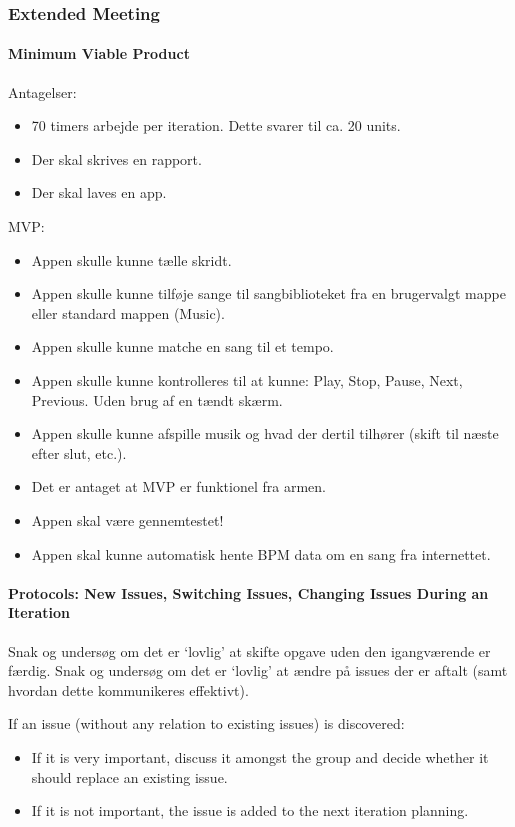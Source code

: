 \subsubsection{Extended Meeting}

\paragraph{Minimum Viable Product}
Antagelser:
\begin{itemize}
\item 70 timers arbejde per iteration. Dette svarer til ca. 20 units.
\item Der skal skrives en rapport.
\item Der skal laves en app.
\end{itemize}
MVP:
\begin{itemize}
\item Appen skulle kunne tælle skridt.
\item Appen skulle kunne tilføje sange til sangbiblioteket fra en brugervalgt mappe eller standard mappen (Music).
\item Appen skulle kunne matche en sang til et tempo.
\item Appen skulle kunne kontrolleres til at kunne: Play, Stop, Pause, Next, Previous. Uden brug af en tændt skærm.
\item Appen skulle kunne afspille musik og hvad der dertil tilhører (skift til næste efter slut, etc.).
\item Det er antaget at MVP er funktionel fra armen.
\item Appen skal være gennemtestet!
\item Appen skal kunne automatisk hente BPM data om en sang fra internettet.
\end{itemize}

\paragraph{Protocols: New Issues, Switching Issues, Changing Issues During an Iteration}
Snak og undersøg om det er ‘lovlig' at skifte opgave uden den igangværende er færdig.
Snak og undersøg om det er ‘lovlig'  at ændre på issues der er aftalt (samt hvordan dette kommunikeres effektivt).

If an issue (without any relation to existing issues) is discovered:
\begin{itemize}
\item If it is very important, discuss it amongst the group and decide whether it should replace an existing issue.
\item If it is not important, the issue is added to the next iteration planning.
\end{itemize}

